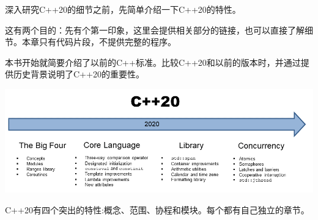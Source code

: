 

深入研究C++20的细节之前，先简单介绍一下C++20的特性。

这有两个目的：先有个第一印象，这里会提供相关部分的链接，也可以直接了解细节。本章只有代码片段，不提供完整的程序。

本书开始就简要介绍了以前的C++标准。比较C++20和以前的版本时，并通过提供历史背景说明了C++20的重要性。

\begin{center}
\includegraphics[width=1.0\textwidth]{content/2/chapter3/images/1.png}\\
\end{center}

C++20有四个突出的特性:概念、范围、协程和模块。每个都有自己独立的章节。








